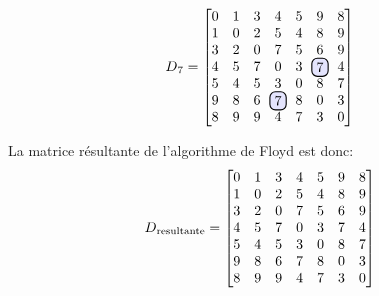 \documentclass[devoir3.tex]{subfiles}
\begin{document}
\begin{align*}
	D\textsubscript{7} =
	\begin{bmatrix}
		0 		& 1 	  	& 3 		& 4 	  	  & 5		& 9	 	& 8 \\
		1 		& 0 		& 2		& 5		  & 4		& 8	 	& 9  \\	
		3	 	& 2 		& 0 		& 7	 	  & 5 	  	& 6 		& 9   \\
		4 		& 5		& 7	  	& 0 	  	  & 3	  	& \hlight{7}	& 4 \\
		5  		& 4 	 	& 5 		& 3 	  	  & 0 	  	& 8 	 	& 7  \\
		9	 	& 8	 	& 6		& \hlight{7}	  & 8 	  	& 0 	 	& 3   \\
		8 		& 9 		& 9		& 4 	  	  & 7 	  	& 3 	 	& 0
	\end{bmatrix}
\end{align*}

La matrice résultante de l'algorithme de Floyd est donc:
\begin{align*}
	D\textsubscript{resultante} =
	\begin{bmatrix}
		0 		& 1 	  	& 3 		& 4 	  	  & 5		& 9	 	& 8 \\
		1 		& 0 		& 2		& 5		  & 4		& 8	 	& 9  \\	
		3	 	& 2 		& 0 		& 7	 	  & 5 	  	& 6 		& 9   \\
		4 		& 5		& 7	  	& 0 	  	  & 3	  	& 7		& 4 \\
		5  		& 4 	 	& 5 		& 3 	  	  & 0 	  	& 8 	 	& 7  \\
		9	 	& 8	 	& 6		& 7		  & 8 	  	& 0 	 	& 3   \\
		8 		& 9 		& 9		& 4 	  	  & 7 	  	& 3 	 	& 0
	\end{bmatrix}
\end{align*}
\end{document}
